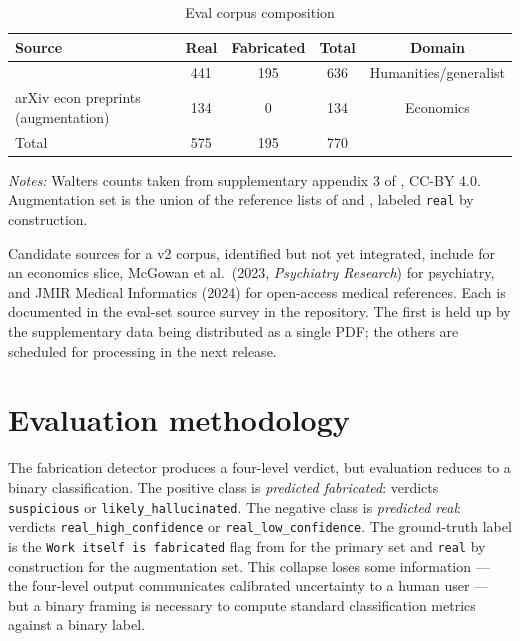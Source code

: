 \documentclass[12pt]{article}
\begin{document}
\begin{table}[htbp]
\centering
\caption{Eval corpus composition}
\label{tab:eval-sources}
\begin{threeparttable}
\begin{tabular}{lcccc}
\toprule
Source                                   & Real & Fabricated & Total & Domain        \\
\midrule
\citet{walters_wilder_2023}              & 441  & 195        & 636   & Humanities/generalist \\
arXiv econ preprints (augmentation)      & 134  & 0          & 134   & Economics     \\
\midrule
Total                                    & 575  & 195        & 770   &               \\
\bottomrule
\end{tabular}
\begin{tablenotes}\small
\item \textit{Notes:} Walters counts taken from supplementary appendix 3 of \citet{walters_wilder_2023}, CC-BY 4.0. Augmentation set is the union of the reference lists of \citet{callaway_santanna_2021_preprint} and \citet{borusyak_jaravel_spiess_2024_preprint}, labeled \texttt{real} by construction.
\end{tablenotes}
\end{threeparttable}
\end{table}

Candidate sources for a v2 corpus, identified but not yet integrated, include \citet{buchanan_hill_shapoval_2024} for an economics slice, McGowan et al.\ (2023, \emph{Psychiatry Research}) for psychiatry, and JMIR Medical Informatics (2024) for open-access medical references. Each is documented in the eval-set source survey in the repository. The first is held up by the supplementary data being distributed as a single PDF; the others are scheduled for processing in the next release.

\section{Evaluation methodology}\label{sec:methodology}

The fabrication detector produces a four-level verdict, but evaluation reduces to a binary classification. The positive class is \emph{predicted fabricated}: verdicts \texttt{suspicious} or \texttt{likely\_hallucinated}. The negative class is \emph{predicted real}: verdicts \texttt{real\_high\_confidence} or \texttt{real\_low\_confidence}. The ground-truth label is the \texttt{Work itself is fabricated} flag from \citet{walters_wilder_2023} for the primary set and \texttt{real} by construction for the augmentation set. This collapse loses some information --- the four-level output communicates calibrated uncertainty to a human user --- but a binary framing is necessary to compute standard classification metrics against a binary label.
\end{document}
